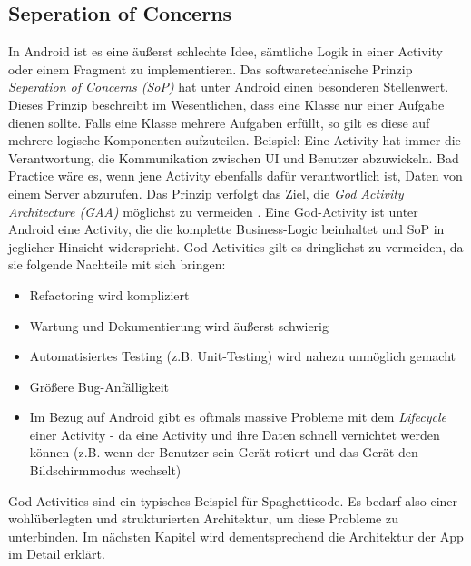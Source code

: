 \hypertarget{seperation-of-concerns}{%
\subsection{Seperation of Concerns}\label{seperation-of-concerns}}

In Android ist es eine äußerst schlechte Idee, sämtliche Logik in einer
Activity oder einem Fragment zu implementieren. Das softwaretechnische
Prinzip \emph{Seperation of Concerns (SoP)} hat unter Android einen
besonderen Stellenwert. Dieses Prinzip beschreibt im Wesentlichen, dass
eine Klasse nur einer Aufgabe dienen sollte. Falls eine Klasse mehrere
Aufgaben erfüllt, so gilt es diese auf mehrere logische Komponenten
aufzuteilen. Beispiel: Eine Activity hat immer die Verantwortung, die
Kommunikation zwischen UI und Benutzer abzuwickeln. Bad Practice wäre
es, wenn jene Activity ebenfalls dafür verantwortlich ist, Daten von
einem Server abzurufen. Das Prinzip verfolgt das Ziel, die
\emph{God Activity Architecture (GAA)} möglichst zu vermeiden
\cite{god-activities}. Eine God-Activity ist unter Android eine
Activity, die die komplette Business-Logic beinhaltet und SoP in
jeglicher Hinsicht widerspricht. God-Activities gilt es dringlichst zu
vermeiden, da sie folgende Nachteile mit sich bringen:

\begin{itemize}
\tightlist
\item
  Refactoring wird kompliziert
\item
  Wartung und Dokumentierung wird äußerst schwierig
\item
  Automatisiertes Testing (z.B. Unit-Testing) wird nahezu unmöglich
  gemacht
\item
  Größere Bug-Anfälligkeit
\item
  Im Bezug auf Android gibt es oftmals massive Probleme mit dem
  \emph{Lifecycle} einer Activity - da eine Activity und ihre Daten
  schnell vernichtet werden können (z.B. wenn der Benutzer sein Gerät
  rotiert und das Gerät den Bildschirmmodus wechselt)
\end{itemize}

God-Activities sind ein typisches Beispiel für Spaghetticode. Es bedarf
also einer wohlüberlegten und strukturierten Architektur, um diese
Probleme zu unterbinden. Im nächsten Kapitel wird dementsprechend die
Architektur der App im Detail erklärt.

